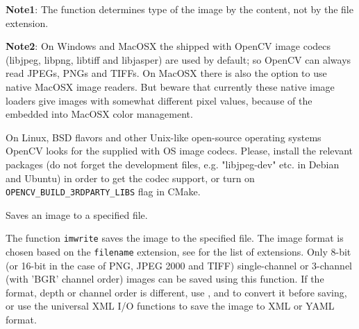 \textbf{Note1}: The function determines type of the image by the content, not by the file extension.

\textbf{Note2}: On Windows and MacOSX the shipped with OpenCV image codecs (libjpeg, libpng, libtiff and libjasper) are used by default; so OpenCV can always read JPEGs, PNGs and TIFFs. On MacOSX there is also the option to use native MacOSX image readers. But beware that currently these native image loaders give images with somewhat different pixel values, because of the embedded into MacOSX color management.

On Linux, BSD flavors and other Unix-like open-source operating systems OpenCV looks for the supplied with OS image codecs. Please, install the relevant packages (do not forget the development files, e.g. "libjpeg-dev" etc. in Debian and Ubuntu) in order to get the codec support, or turn on \texttt{OPENCV\_BUILD\_3RDPARTY\_LIBS} flag in CMake. 

Saves an image to a specified file.

\begin{description}
\end{description}

The function \texttt{imwrite} saves the image to the specified file. The image format is chosen based on the \texttt{filename} extension, see  for the list of extensions. Only 8-bit (or 16-bit in the case of PNG, JPEG 2000 and TIFF) single-channel or 3-channel (with 'BGR' channel order) images can be saved using this function. If the format, depth or channel order is different, use , and  to convert it before saving, or use the universal XML I/O functions to save the image to XML or YAML format.



